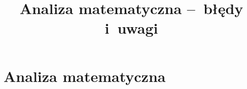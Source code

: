\documentclass[a4paper,11pt]{article}
\title{Analiza matematyczna --~błędy i~uwagi}
\begin{document}



\maketitle  %



\section{Analiza matematyczna}

\vspace{\spaceTwo}








\end{document}
